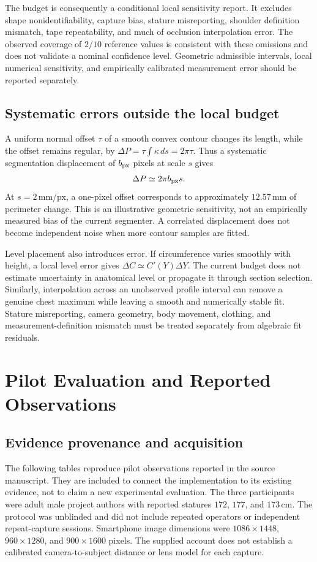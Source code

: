 \documentclass[11pt,a4paper]{article}
\numberwithin{equation}{section}
\begin{document}
The budget is consequently a conditional local sensitivity report. It excludes shape nonidentifiability, capture bias, stature misreporting, shoulder definition mismatch, tape repeatability, and much of occlusion interpolation error. The observed coverage of $2/10$ reference values is consistent with these omissions and does not validate a nominal confidence level. Geometric admissible intervals, local numerical sensitivity, and empirically calibrated measurement error should be reported separately.


\subsection{Systematic errors outside the local budget}
\label{subsec:systematic_errors}
A uniform normal offset $\tau$ of a smooth convex contour changes its length, while the offset remains regular, by $\Delta P=\tau\int\kappa\,ds=2\pi\tau$. Thus a systematic segmentation displacement of $b_{\rm px}$ pixels at scale $s$ gives
\begin{equation}
\Delta P\simeq2\pi b_{\rm px}s.
\label{eq:boundary_bias}
\end{equation}
At $s=2$\,mm/px, a one-pixel offset corresponds to approximately $12.57$\,mm of perimeter change. This is an illustrative geometric sensitivity, not an empirically measured bias of the current segmenter. A correlated displacement does not become independent noise when more contour samples are fitted.

Level placement also introduces error. If circumference varies smoothly with height, a local level error gives $\Delta C\simeq C'(Y)\Delta Y$. The current budget does not estimate uncertainty in anatomical level or propagate it through section selection. Similarly, interpolation across an unobserved profile interval can remove a genuine chest maximum while leaving a smooth and numerically stable fit. Stature misreporting, camera geometry, body movement, clothing, and measurement-definition mismatch must be treated separately from algebraic fit residuals.

\section{Pilot Evaluation and Reported Observations}
\label{sec:pilot}
\subsection{Evidence provenance and acquisition}
The following tables reproduce pilot observations reported in the source manuscript. They are included to connect the implementation to its existing evidence, not to claim a new experimental evaluation. The three participants were adult male project authors with reported statures $172$, $177$, and $173$\,cm. The protocol was unblinded and did not include repeated operators or independent repeat-capture sessions. Smartphone image dimensions were $1086\times1448$, $960\times1280$, and $900\times1600$ pixels. The supplied account does not establish a calibrated camera-to-subject distance or lens model for each capture.
\end{document}
